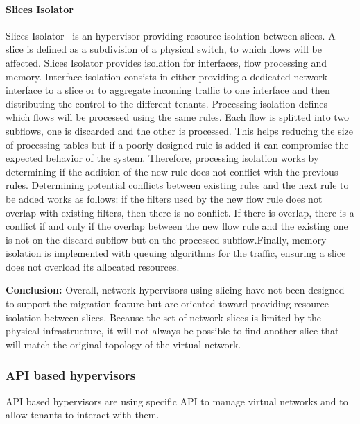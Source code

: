 \paragraph{Slices Isolator}
Slices Isolator~\cite{SlicesIsolator-El-Azzab2011} is an hypervisor providing resource isolation between slices. A slice is defined as a subdivision of a physical switch, to which flows will be affected. Slices Isolator provides isolation for interfaces, flow processing and memory. Interface isolation consists in either providing a dedicated network interface to a slice or to aggregate incoming traffic to one interface and then distributing the control to the different tenants. Processing isolation defines which flows will be processed using the same rules. Each flow is splitted into two subflows, one is discarded and the other is processed. This helps reducing the size of processing tables but if a poorly designed rule is added it can compromise the expected behavior of the system. Therefore, processing isolation works by determining if the addition of the new rule does not conflict with the previous rules. Determining potential conflicts between existing rules and the next rule to be added works as follows: if the filters used by the new flow rule does not overlap with existing filters, then there is no conflict.
If there is overlap, there is a conflict if and only if the overlap between the new flow rule and the existing one is not on the discard subflow but on the processed subflow.Finally, memory isolation is implemented with queuing algorithms for the traffic, ensuring a slice does not overload its allocated resources. 

\textbf{Conclusion:} Overall, network hypervisors using slicing have not been designed to support the migration feature but are oriented toward providing resource isolation between slices. Because the set of network slices is limited by the physical infrastructure, it will not always be possible to find another slice that will match the original topology of the virtual network.

\subsubsection{API based hypervisors}
API based hypervisors are using specific API to manage virtual networks and to allow tenants to interact with them.

